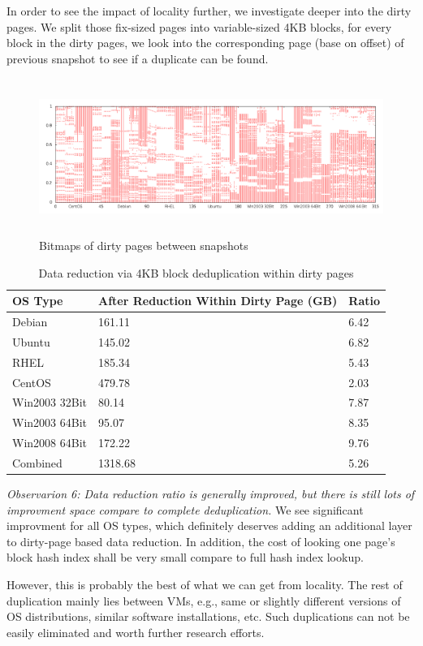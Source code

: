 In order to see the impact of locality further, we investigate deeper into the dirty pages.
We split those fix-sized pages into variable-sized 4KB blocks, for every block in the dirty pages,
we look into the corresponding
page (base on offset) of previous snapshot to see if a duplicate can be found.

\begin{figure}[thbp]
  \centering
  \includegraphics[width=6.5in,height=2in]{countmodify.png}
\caption{Bitmaps of dirty pages between snapshots}
\label{fig:dirty}
\end{figure}

\begin{table}[htb]
  \centering
    \begin{tabular}{|l|p{1.3in}|p{0.4in}|}
        \hline
        OS Type & After Reduction Within \newline Dirty Page (GB) & Ratio \\ \hline
        Debian & 161.11 & 6.42 \\ \hline
        Ubuntu & 145.02 & 6.82 \\ \hline
        RHEL & 185.34 & 5.43 \\ \hline
        CentOS & 479.78 & 2.03 \\ \hline
        Win2003 32Bit & 80.14 & 7.87 \\ \hline
        Win2003 64Bit & 95.07 & 8.35 \\ \hline
        Win2008 64Bit & 172.22 & 9.76 \\ \hline
        Combined & 1318.68 & 5.26 \\
        \hline
    \end{tabular}
    \caption{Data reduction via 4KB block deduplication within dirty pages}
    \label{tab:locality}
\end{table}

\emph{Observarion 6: Data reduction ratio is generally improved, but there is still lots of
improvment space compare to complete deduplication.} We see significant improvment for all OS
types, which definitely deserves adding an additional layer to dirty-page based 
data reduction. In addition, the cost of looking one page's block hash index
shall be very small compare to full hash index lookup.

However, this is probably the best of what we can get from locality. The rest of
duplication mainly lies between VMs, e.g., same or slightly different versions of OS distributions, 
similar software installations, etc. Such duplications can not be easily 
eliminated and worth further research efforts.
